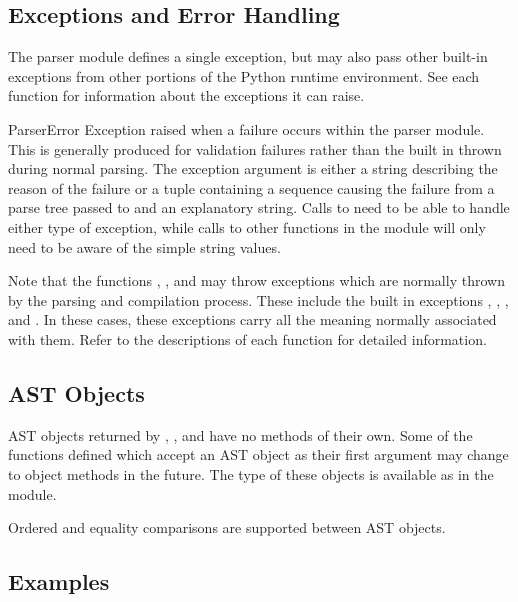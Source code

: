 \subsection{Exceptions and Error Handling}

The parser module defines a single exception, but may also pass other
built-in exceptions from other portions of the Python runtime
environment.  See each function for information about the exceptions
it can raise.

\begin{excdesc}{ParserError}
Exception raised when a failure occurs within the parser module.  This
is generally produced for validation failures rather than the built in
 thrown during normal parsing.
The exception argument is either a string describing the reason of the
failure or a tuple containing a sequence causing the failure from a parse
tree passed to  and an explanatory string.  Calls to
 need to be able to handle either type of exception,
while calls to other functions in the module will only need to be
aware of the simple string values.
\end{excdesc}

Note that the functions , , and
 may throw exceptions which are normally thrown by the
parsing and compilation process.  These include the built in
exceptions , ,
, and .  In these cases, these
exceptions carry all the meaning normally associated with them.  Refer
to the descriptions of each function for detailed information.


\subsection{AST Objects}

AST objects returned by , , and
 have no methods of their own.
Some of the functions defined which accept an AST object as their
first argument may change to object methods in the future.  The type
of these objects is available as  in the module.

Ordered and equality comparisons are supported between AST objects.


\subsection{Examples}

